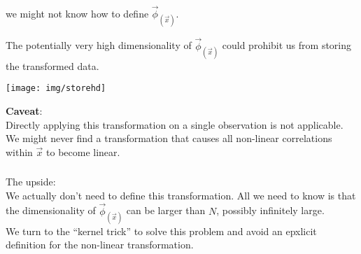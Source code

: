 \begin{frame}\frametitle{\secname}

\pause
{} we might not know how to define $\vec \phi_{(\vec x)}$.

\pause

The potentially very high dimensionality of $\vec \phi_{(\vec x)}$ could prohibit us from storing the transformed data.\\

\begin{center}
	\texttt{[image: img/storehd]}%
\end{center}



\pause

\svspace{5mm}

\textbf{Caveat}:\\
Directly applying this transformation on a single observation is not applicable. 
We might never find a transformation that causes all non-linear correlations within $\vec x$ to become linear.\\

\end{frame}

\begin{frame}\frametitle{\secname}

The upside:\\

We actually don't need to define this transformation.
All we need to know is that the dimensionality of $\vec{\phi}_{(\vec{x})}$ can be larger than $N$, possibly infinitely large.\\

We turn to the ``kernel trick'' to solve this problem and avoid an epxlicit definition for the non-linear transformation.

\end{frame}
